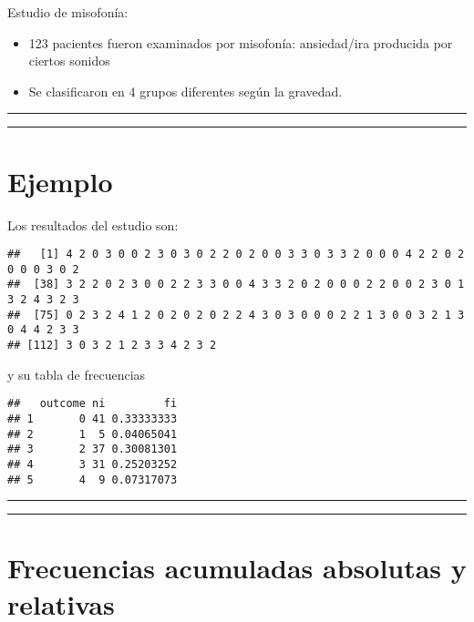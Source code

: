 \documentclass[
]{book}
\begin{document}
Estudio de misofonía:

\begin{itemize}
\item
  123 pacientes fueron examinados por misofonía: ansiedad/ira producida por ciertos sonidos
\item
  Se clasificaron en 4 grupos diferentes según la gravedad.
\end{itemize}

\begin{center}\rule{0.5\linewidth}{0.5pt}\end{center}

\begin{center}\rule{0.5\linewidth}{0.5pt}\end{center}

\hypertarget{ejemplo-2}{%
\section{Ejemplo}\label{ejemplo-2}}

Los resultados del estudio son:

\begin{verbatim}
##   [1] 4 2 0 3 0 0 2 3 0 3 0 2 2 0 2 0 0 3 3 0 3 3 2 0 0 0 4 2 2 0 2 0 0 0 3 0 2
##  [38] 3 2 2 0 2 3 0 0 2 2 3 3 0 0 4 3 3 2 0 2 0 0 0 2 2 0 0 2 3 0 1 3 2 4 3 2 3
##  [75] 0 2 3 2 4 1 2 0 2 0 2 0 2 2 4 3 0 3 0 0 0 2 2 1 3 0 0 3 2 1 3 0 4 4 2 3 3
## [112] 3 0 3 2 1 2 3 3 4 2 3 2
\end{verbatim}

y su tabla de frecuencias

\begin{verbatim}
##   outcome ni         fi
## 1       0 41 0.33333333
## 2       1  5 0.04065041
## 3       2 37 0.30081301
## 4       3 31 0.25203252
## 5       4  9 0.07317073
\end{verbatim}

\begin{center}\rule{0.5\linewidth}{0.5pt}\end{center}

\begin{center}\rule{0.5\linewidth}{0.5pt}\end{center}

\hypertarget{frecuencias-acumuladas-absolutas-y-relativas}{%
\section{Frecuencias acumuladas absolutas y relativas}\label{frecuencias-acumuladas-absolutas-y-relativas}}
\end{document}
